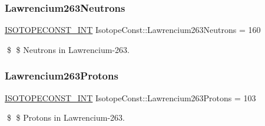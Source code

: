 \subsubsection{\texorpdfstring{Lawrencium263\+Neutrons}{Lawrencium263Neutrons}}
{\footnotesize\ttfamily \mbox{\hyperlink{group___isotope_const-_macros_ga5f18360b3e99483a35c32d789e62621c}{I\+S\+O\+T\+O\+P\+E\+C\+O\+N\+S\+T\+\_\+\+I\+NT}} Isotope\+Const\+::\+Lawrencium263\+Neutrons = 160}

\$ \$ Neutrons in Lawrencium-\/263. \mbox{\label{group___isotope_const-_lawrencium-_lr263_ga719c5f08124d3b2c4f6a0863051d2639}} 
\subsubsection{\texorpdfstring{Lawrencium263\+Protons}{Lawrencium263Protons}}
{\footnotesize\ttfamily \mbox{\hyperlink{group___isotope_const-_macros_ga5f18360b3e99483a35c32d789e62621c}{I\+S\+O\+T\+O\+P\+E\+C\+O\+N\+S\+T\+\_\+\+I\+NT}} Isotope\+Const\+::\+Lawrencium263\+Protons = 103}

\$ \$ Protons in Lawrencium-\/263. 